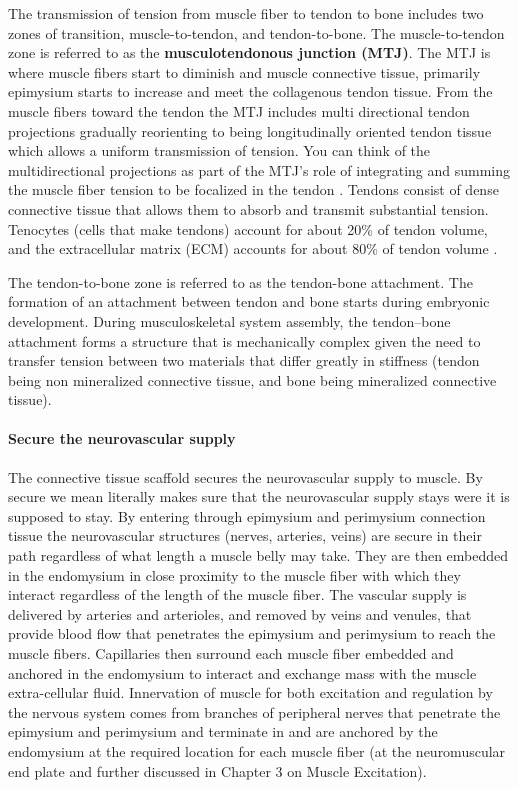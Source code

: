 The transmission of tension from muscle fiber to tendon to bone includes two zones of transition, muscle-to-tendon, and tendon-to-bone. The muscle-to-tendon zone is referred to as the \textbf{musculotendonous junction (MTJ)}. The MTJ is where muscle fibers start to diminish and muscle connective tissue, primarily epimysium starts to increase and meet the collagenous tendon tissue. From the muscle fibers toward the tendon the MTJ includes multi directional tendon projections gradually reorienting to being longitudinally oriented tendon tissue which allows a uniform transmission of tension. You can think of the multidirectional projections as part of the MTJ's role of integrating and summing the muscle fiber tension to be focalized in the tendon \cite{knudsen_human_2015}. Tendons consist of dense connective tissue that allows them to absorb and transmit substantial tension. Tenocytes (cells that make tendons) account for about 20\% of tendon volume, and the extracellular matrix (ECM) accounts for about 80\% of tendon volume \cite{kjaer_role_2004}. 

The tendon-to-bone zone is referred to as the tendon-bone attachment. The formation of an attachment between tendon and bone starts during embryonic development. During musculoskeletal system assembly, the tendon–bone attachment  forms a structure that is mechanically complex given the need to transfer tension between two materials that differ greatly in stiffness (tendon being non mineralized connective tissue, and bone being mineralized connective tissue).    

\paragraph{Secure the neurovascular supply}
The connective tissue scaffold secures the neurovascular supply to muscle. By secure we mean literally makes sure that the neurovascular supply stays were it is supposed to stay. By entering through epimysium and perimysium connection tissue the neurovascular structures (nerves, arteries, veins) are secure in their path regardless of what length a muscle belly may take. They are then embedded in the endomysium in close proximity to the muscle fiber with which they  interact regardless of the length of the muscle fiber. The vascular supply is delivered by arteries and arterioles, and removed by veins and venules, that provide blood flow that penetrates the epimysium and perimysium to reach the muscle fibers. Capillaries then surround each muscle fiber embedded and anchored in the endomysium to interact and exchange mass with the muscle extra-cellular fluid. Innervation of muscle for both excitation and regulation by the nervous system comes from branches of peripheral nerves that penetrate the epimysium and perimysium and terminate in and are anchored by the endomysium at the required location for each muscle fiber (at the neuromuscular end plate and further discussed in Chapter 3 on Muscle Excitation).


